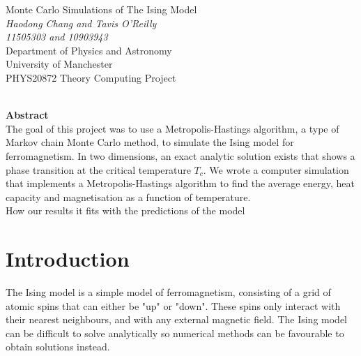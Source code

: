 \documentclass[11pt]{article}
\begin{document}
	
	\begin{titlepage}
		\begin{center}
			{\Huge Monte Carlo Simulations of The Ising Model}\\[0.5cm]
			\textit{Haodong Chang and Tavis O'Reilly}\\[0.3cm]
			\textit{11505303 and 10903943}\\[0.3cm]
			Department of Physics and Astronomy\\[0.3cm]
			University of Manchester\\[0.3cm]
			PHYS20872 Theory Computing Project\\[0.3cm]
			\shortmonthname[\the\month]  \the\year \\[4cm]
			
		\end{center}
		
		{\Large \textbf{Abstract}}\\[0.3cm]
		The goal of this project was to use a Metropolis-Hastings algorithm, a type of Markov chain Monte Carlo method, to simulate the Ising model for ferromagnetism. In two dimensions, an exact analytic solution exists\cite{onsager_solution} that shows a phase transition at the critical temperature $T_c$. We wrote a computer simulation that implements a Metropolis-Hastings algorithm to find the average energy, heat capacity and magnetisation as a function of temperature. \\
		
		How our results it fits with the predictions of the model
		
	\end{titlepage}
	
	\clearpage
	\setcounter{page}{2}
	
	\newpage
	
	\section{Introduction}
	
	The Ising model is a simple model of ferromagnetism, consisting of a grid of atomic spins that can either be "up" or "down". These spins only interact with their nearest neighbours, and with any external magnetic field. The Ising model can be difficult to solve analytically so numerical methods can be favourable to obtain solutions instead. \\
	
\end{document}
